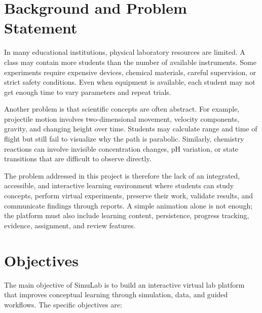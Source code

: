 \documentclass[12pt,a4paper]{report}
\begin{document}
\section{Background and Problem Statement}
In many educational institutions, physical laboratory resources are limited. A class may contain more students than the number of available instruments. Some experiments require expensive devices, chemical materials, careful supervision, or strict safety conditions. Even when equipment is available, each student may not get enough time to vary parameters and repeat trials.

Another problem is that scientific concepts are often abstract. For example, projectile motion involves two-dimensional movement, velocity components, gravity, and changing height over time. Students may calculate range and time of flight but still fail to visualize why the path is parabolic. Similarly, chemistry reactions can involve invisible concentration changes, pH variation, or state transitions that are difficult to observe directly.

The problem addressed in this project is therefore the lack of an integrated, accessible, and interactive learning environment where students can study concepts, perform virtual experiments, preserve their work, validate results, and communicate findings through reports. A simple animation alone is not enough; the platform must also include learning content, persistence, progress tracking, evidence, assignment, and review features.

\section{Objectives}
The main objective of SimuLab is to build an interactive virtual lab platform that improves conceptual learning through simulation, data, and guided workflows. The specific objectives are:
\end{document}

